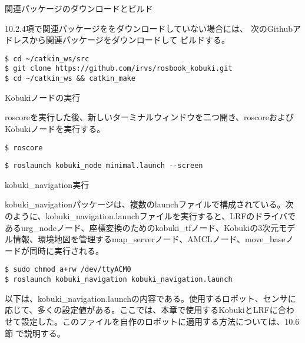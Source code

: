 \setcounter{num}{0}

\circled{\thenum} 関連パッケージのダウンロードとビルド

10.2.4項で関連パッケージををダウンロードしていない場合には、  次のGithubアドレスから関連パッケージをダウンロードして  ビルドする。

\begin{lstlisting}[language=ROS]
$ cd ~/catkin_ws/src
$ git clone https://github.com/irvs/rosbook_kobuki.git
$ cd ~/catkin_ws && catkin_make
\end{lstlisting}

\circled{\thenum} Kobukiノードの実行

roscoreを実行した後、新しいターミナルウィンドウを二つ開き、roscoreおよびKobukiノードを実行する。

\begin{lstlisting}[language=ROS]
$ roscore
\end{lstlisting}

\begin{lstlisting}[language=ROS]
$ roslaunch kobuki_node minimal.launch --screen
\end{lstlisting}

\circled{\thenum} kobuki\_navigation実行

kobuki\_navigationパッケージは、複数のlaunchファイルで構成されている。次のように、kobuki\_navigation.launchファイルを実行すると、LRFのドライバであるurg\_nodeノード、座標変換のためのkobuki\_tfノード、Kobukiの3次元モデル情報、環境地図を管理するmap\_serverノード、AMCLノード、move\_baseノードが同時に実行される。

\begin{lstlisting}[language=ROS]
$ sudo chmod a+rw /dev/ttyACM0
$ roslaunch kobuki_navigation kobuki_navigation.launch
\end{lstlisting}

以下は、kobuki\_navigation.launchの内容である。使用するロボット、センサに応じて、多くの設定値がある。ここでは、本章で使用するKobukiとLRFに合わせて設定した。このファイルを自作のロボットに適用する方法については、10.6節 で説明する。

